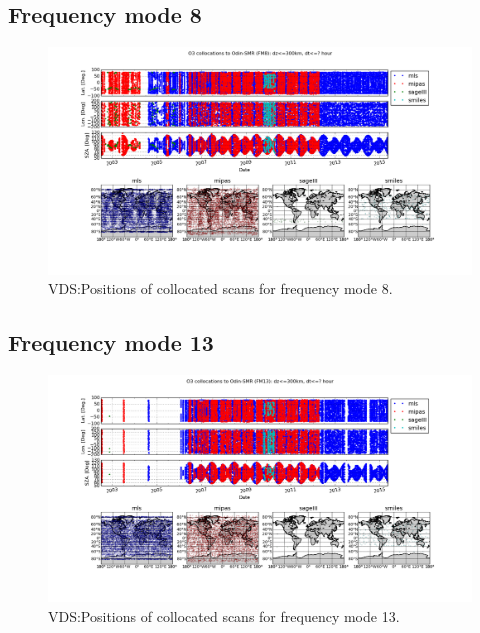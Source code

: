 \clearpage
\newpage

\subsection{Frequency mode 8}

\begin{figure}[t]
\centering
\includegraphics[width=17cm]{test_collocation_fm8.png}
\caption{VDS:Positions of collocated scans for frequency mode 8.}
\label{fig:vdsfm8}
\end{figure}

\clearpage
\newpage

\subsection{Frequency mode 13}

\begin{figure}[t]
\centering
\includegraphics[width=17cm]{test_collocation_fm13.png}
\caption{VDS:Positions of collocated scans for frequency mode 13.}
\label{fig:vdsfm13}
\end{figure}

\clearpage
\newpage

